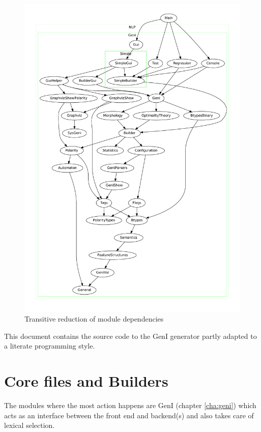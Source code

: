 \documentclass[a4paper,11pt]{report}
\begin{document}
\begin{figure}[h]
\begin{center}
\includegraphics[scale=0.5]{images/genidep}
\caption{Transitive reduction of module dependencies}
\end{center}
\end{figure}

This document contains the source code to the GenI generator 
partly adapted to a literate programming style.  

\section{Core files and Builders}

The modules where the most action happens are GenI (chapter
\ref{cha:geni}) which acts as an interface between the front end and
backend(s) and also takes care of lexical selection.
\end{document}
